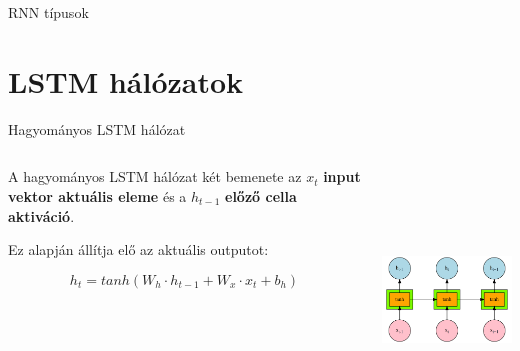 \documentclass[english, aspectratio=169]{beamer}
\makeatletter
\let\origtableofcontents=\tableofcontents
\def\tableofcontents{\@ifnextchar[{\origtableofcontents}{\gobbletableofcontents}}
\def\gobbletableofcontents#1{\origtableofcontents}
\makeatother
\begin{document}
\begin{frame}{RNN típusok}
{\begin{center}
\end{center}}
\end{frame}

\section{LSTM hálózatok}

\begin{frame}
\tableofcontents[currentsection]
\end{frame}

\begin{frame}{Hagyományos LSTM hálózat}
\begin{columns}
\begin{column}{.5\textwidth}
A hagyományos LSTM hálózat két bemenete az $x_t$  \textbf{input vektor aktuális eleme} és a $h_{t-1}$ \textbf{előző cella aktiváció}.\par\smallskip
Ez alapján állítja elő az aktuális outputot:
\begin{block}{}
\vspace{-0.5cm}
\[
h_t = tanh\left(W_h \cdot h_{t-1} + W_x \cdot x_t + b_h\right)
\]
\end{block}
\end{column}
\begin{column}{.5\textwidth}
\begin{center}
\includegraphics[height=7cm, width=7cm, keepaspectratio]{graphs/recurrent_17.png}
\end{center}
\end{column}
\end{columns}
\end{frame}
\end{document}
